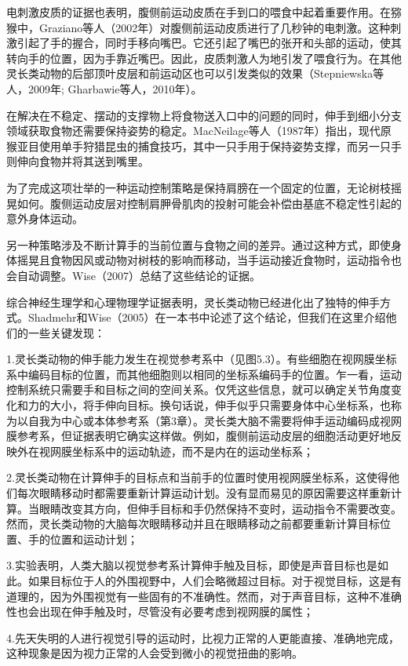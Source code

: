 电刺激皮质的证据也表明，腹侧前运动皮质在手到口的喂食中起着重要作用。在猕猴中，Graziano等人（2002年）对腹侧前运动皮质进行了几秒钟的电刺激。这种刺激引起了手的握合，同时手移向嘴巴。它还引起了嘴巴的张开和头部的运动，使其转向手的位置，因为手靠近嘴巴。因此，皮质刺激人为地引发了喂食行为。在其他灵长类动物的后部顶叶皮层和前运动区也可以引发类似的效果（Stepniewska等人，2009年; Gharbawie等人，2010年）。

在解决在不稳定、摆动的支撑物上将食物送入口中的问题的同时，伸手到细小分支领域获取食物还需要保持姿势的稳定。MacNeilage等人（1987年）指出，现代原猴亚目使用单手狩猎昆虫的捕食技巧，其中一只手用于保持姿势支撑，而另一只手则伸向食物并将其送到嘴里。

为了完成这项壮举的一种运动控制策略是保持肩膀在一个固定的位置，无论树枝摇晃如何。腹侧运动皮层对控制肩胛骨肌肉的投射可能会补偿由基底不稳定性引起的意外身体运动。

另一种策略涉及不断计算手的当前位置与食物之间的差异。通过这种方式，即使身体摇晃且食物因风或动物对树枝的影响而移动，当手运动接近食物时，运动指令也会自动调整。Wise（2007）总结了这些结论的证据。

综合神经生理学和心理物理学证据表明，灵长类动物已经进化出了独特的伸手方式。Shadmehr和Wise（2005）在一本书中论述了这个结论，但我们在这里介绍他们的一些关键发现：\par
1.灵长类动物的伸手能力发生在视觉参考系中（见图5.3）。有些细胞在视网膜坐标系中编码目标的位置，而其他细胞则以相同的坐标系编码手的位置。乍一看，运动控制系统只需要手和目标之间的空间关系。仅凭这些信息，就可以确定关节角度变化和力的大小，将手伸向目标。换句话说，伸手似乎只需要身体中心坐标系，也称为以自我为中心或本体参考系（第3章）。灵长类大脑不需要将伸手运动编码成视网膜参考系，但证据表明它确实这样做。例如，腹侧前运动皮层的细胞活动更好地反映外在视网膜坐标系中的运动轨迹，而不是内在的运动坐标系；\par
2.灵长类动物在计算伸手的目标点和当前手的位置时使用视网膜坐标系，这使得他们每次眼睛移动时都需要重新计算运动计划。没有显而易见的原因需要这样重新计算。当眼睛改变其方向，但伸手目标和手仍然保持不变时，运动指令不需要改变。然而，灵长类动物的大脑每次眼睛移动并且在眼睛移动之前都要重新计算目标位置、手的位置和运动计划；\par
3.实验表明，人类大脑以视觉参考系计算伸手触及目标，即使是声音目标也是如此。如果目标位于人的外围视野中，人们会略微超过目标。对于视觉目标，这是有道理的，因为外围视觉有一些固有的不准确性。然而，对于声音目标，这种不准确性也会出现在伸手触及时，尽管没有必要考虑到视网膜的属性；\par
4.先天失明的人进行视觉引导的运动时，比视力正常的人更能直接、准确地完成，这种现象是因为视力正常的人会受到微小的视觉扭曲的影响。

